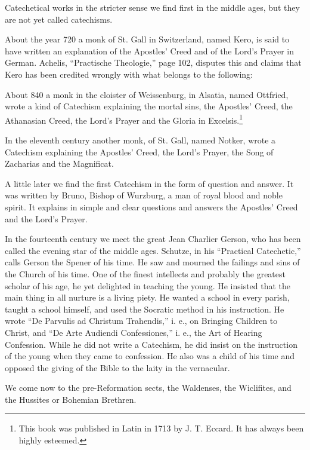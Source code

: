  Catechetical works in the stricter sense we find first in the middle ages, but they are not yet called catechisms.

About the year 720 a monk of St. Gall in Switzerland, named Kero, is said to have written an explanation of the Apostles’ Creed and of the Lord’s Prayer in German. Achelis, “Practische Theologie,” page 102, disputes this and claims that Kero has been credited wrongly with what belongs to the following:

About 840 a monk in the cloister of Weissenburg, in Alsatia, named Ottfried, wrote a kind of Catechism explaining the mortal sins, the Apostles’ Creed, the Athanasian Creed, the Lord’s Prayer and the Gloria in Excelsis.\footnote{This book was published in Latin in 1713 by J. T. Eccard. It has always been highly esteemed.}

In the eleventh century another monk, of St. Gall, named Notker, wrote a Catechism explaining the Apostles’ Creed, the Lord’s Prayer, the Song of Zacharias and the Magnificat.

A little later we find the first Catechism in the form of question and answer. It was written by Bruno, Bishop of Wurzburg, a man of royal blood and noble spirit. It explains in simple and clear questions and answers the Apostles’ Creed and the Lord’s Prayer.

In the fourteenth century we meet the great Jean Charlier Gerson, who has been called the evening star of the middle ages. Schutze, in his “Practical Catechetic,” calls Gerson the Spener of his time. He saw and mourned the failings and sins of the Church of his time. One of the finest intellects and probably the greatest scholar of his age, he yet delighted in teaching the young. He insisted that the main thing in all nurture is a living piety. He wanted a school in every parish, taught a school himself, and used the Socratic method in his instruction. He wrote “De Parvulis ad Christum Trahendis,” i. e., on Bringing Children to Christ, and “De Arte Audiendi Confessiones,” i. e., the Art of Hearing Confession. While he did not write a Catechism, he did insist on the instruction of the young when they came to confession. He also was a child of his time and opposed the giving of the Bible to the laity in the vernacular. 

We come now to the pre-Reformation sects, the Waldenses, the Wiclifites, and the Hussites or Bohemian Brethren. 


